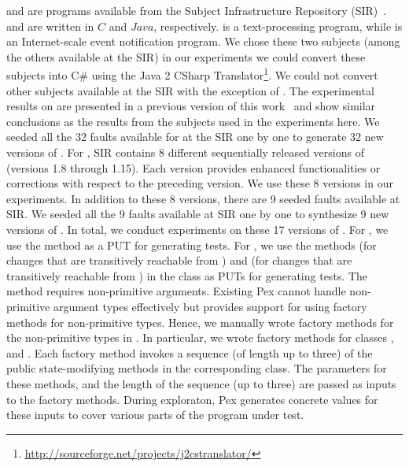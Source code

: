  and  are programs available from the Subject Infrastructure Repository (SIR)~\cite{doESE05}.  and  are written in $C$ and $Java$, respectively.  is a text-processing program, while  is an Internet-scale event notification program. We chose these two subjects (among the others available at the SIR) in our experiments we could convert these subjects into C\# using the Java 2 CSharp Translator\footnote{\url{http://sourceforge.net/projects/j2cstranslator/}}. We could not convert other subjects available at the SIR with the exception of . The experimental results on  are presented in a previous version of this work~\cite{taneja09:guided} and show similar conclusions as the results from the subjects used in the experiments here. We seeded all the 32 faults available for  at the SIR one by one to generate 32 new versions of . For , SIR contains 8 different sequentially released versions of  (versions 1.8 through 1.15). Each version provides enhanced functionalities or corrections with respect to the preceding version. We use these 8 versions in our experiments. In addition to these 8 versions, there are 9 seeded faults available at SIR. We seeded all the 9 faults available at SIR one by one to synthesize 9 new versions of . 
In total, we conduct experiments on these 17 versions of . For , we use the  method as a PUT for generating tests. For , we use the methods  (for changes that are transitively reachable from ) and  (for changes that are transitively reachable from ) in the class  as PUTs for generating tests. The method  requires non-primitive arguments. Existing Pex cannot handle non-primitive argument types effectively but provides support for using factory methods for non-primitive types. Hence, we manually wrote factory methods for the non-primitive types in . In particular, we wrote factory methods for classes ,  and . Each factory method invokes a sequence (of length up to three) of the public state-modifying methods in the corresponding class. The parameters for these methods, and the length of the sequence (up to three) are passed as inputs to the factory methods. During exploraton, Pex generates concrete values for these inputs to cover various parts of the program under test.

